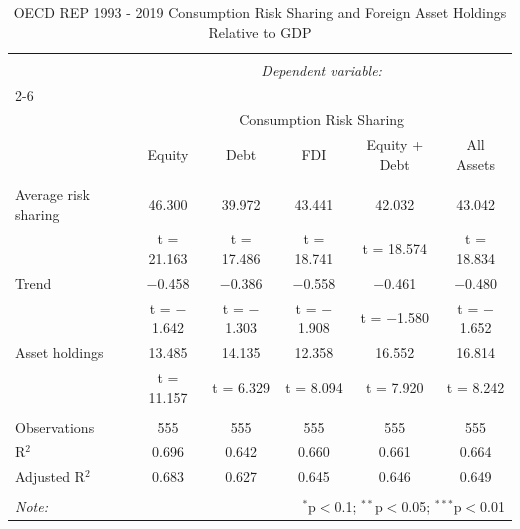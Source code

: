 
\begin{table}[!htbp] \centering 
  \caption{OECD REP 1993 - 2019 Consumption Risk Sharing and Foreign Asset Holdings Relative to GDP} 
  \label{} 
\begin{tabular}{@{\extracolsep{5pt}}lccccc} 
\\[-1.8ex]\hline 
\hline \\[-1.8ex] 
 & \multicolumn{5}{c}{\textit{Dependent variable:}} \\ 
\cline{2-6} 
\\[-1.8ex] & \multicolumn{5}{c}{Consumption Risk Sharing} \\ 
 & Equity & Debt & FDI & Equity + Debt & All Assets \\ 
\hline \\[-1.8ex] 
 Average risk sharing & 46.300 & 39.972 & 43.441 & 42.032 & 43.042 \\ 
  & t = 21.163 & t = 17.486 & t = 18.741 & t = 18.574 & t = 18.834 \\ 
  Trend & $-$0.458 & $-$0.386 & $-$0.558 & $-$0.461 & $-$0.480 \\ 
  & t = $-$1.642 & t = $-$1.303 & t = $-$1.908 & t = $-$1.580 & t = $-$1.652 \\ 
  Asset holdings & 13.485 & 14.135 & 12.358 & 16.552 & 16.814 \\ 
  & t = 11.157 & t = 6.329 & t = 8.094 & t = 7.920 & t = 8.242 \\ 
 \hline \\[-1.8ex] 
Observations & 555 & 555 & 555 & 555 & 555 \\ 
R$^{2}$ & 0.696 & 0.642 & 0.660 & 0.661 & 0.664 \\ 
Adjusted R$^{2}$ & 0.683 & 0.627 & 0.645 & 0.646 & 0.649 \\ 
\hline 
\hline \\[-1.8ex] 
\textit{Note:}  & \multicolumn{5}{r}{$^{*}$p$<$0.1; $^{**}$p$<$0.05; $^{***}$p$<$0.01} \\ 
\end{tabular} 
\end{table} 
